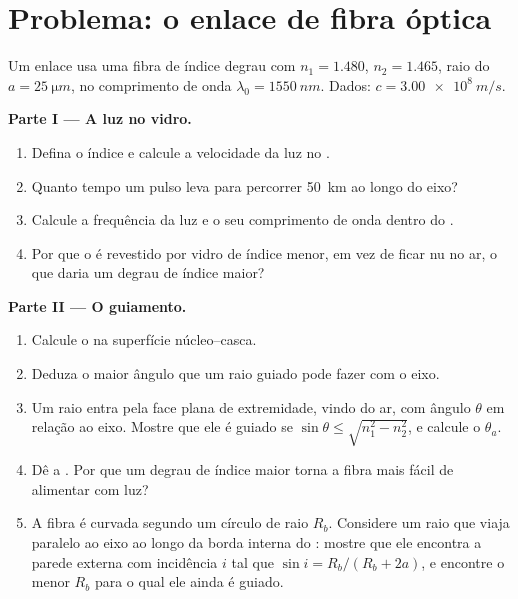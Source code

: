 \section{Problema: o enlace de fibra óptica}

\begin{problem}
\label{pb:b1:rays-reflection-refraction:1}
Um enlace usa uma fibra de índice degrau com  $n_1 = 1.480$, 
$n_2 = 1.465$, raio do  $a = \qty{25}{\micro m}$, no comprimento de onda
$\lambda_0 = \qty{1550}{nm}$. Dados: $c = \qty{3.00e8}{m/s}$.

\medskip
\noindent\textbf{Parte I --- A luz no vidro.}
\begin{enumerate}
  \item Defina o índice e calcule a velocidade da luz no .
  \item Quanto tempo um pulso leva para percorrer \qty{50}{km} ao longo do
        eixo?
  \item Calcule a frequência da luz e o seu comprimento de onda dentro do
        .
  \item Por que o  é revestido por vidro de índice menor, em vez de ficar
        nu no ar, o que daria um degrau de índice maior?
\end{enumerate}

\medskip
\noindent\textbf{Parte II --- O guiamento.}
\begin{enumerate}[resume]
  \item Calcule o  na superfície núcleo--casca.
  \item Deduza o maior ângulo que um raio guiado pode fazer com o eixo.
  \item Um raio entra pela face plana de extremidade, vindo do ar, com ângulo $\theta$ em relação
        ao eixo. Mostre que ele é guiado se $\sin\theta \leq
        \sqrt{n_1^2 - n_2^2}$, e calcule o 
        $\theta_a$.
  \item Dê a . Por que um degrau de índice maior torna
        a fibra mais fácil de alimentar com luz?
  \item A fibra é curvada segundo um círculo de raio $R_b$. Considere um
        raio que viaja paralelo ao eixo ao longo da borda interna do
        : mostre que ele encontra a parede externa com incidência $i$ tal que
        $\sin i = R_b/(R_b + 2a)$, e encontre o menor $R_b$ para o qual
        ele ainda é guiado.
\end{enumerate}


\end{problem}
